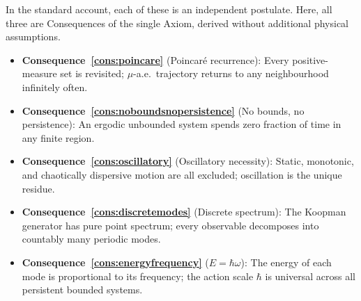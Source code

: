 In the standard account, each of these is an independent postulate.
Here, all three are Consequences of the single Axiom, derived without
additional physical assumptions.

\bigskip
\begin{tcolorbox}[colback=crownblue!5, colframe=crownblue!60!black,
                  title={\textbf{Chapter 3 Summary}}]
\begin{itemize}[noitemsep]
  \item \textbf{Consequence~\ref{cons:poincare}} (Poincaré recurrence):
    Every positive-measure set is revisited; $\mu$-a.e.\ trajectory
    returns to any neighbourhood infinitely often.
  \item \textbf{Consequence~\ref{cons:noboundsnopersistence}} (No bounds,
    no persistence): An ergodic unbounded system spends zero fraction of
    time in any finite region.
  \item \textbf{Consequence~\ref{cons:oscillatory}} (Oscillatory
    necessity): Static, monotonic, and chaotically dispersive motion are
    all excluded; oscillation is the unique residue.
  \item \textbf{Consequence~\ref{cons:discretemodes}} (Discrete spectrum):
    The Koopman generator has pure point spectrum; every observable
    decomposes into countably many periodic modes.
  \item \textbf{Consequence~\ref{cons:energyfrequency}}
    ($E=\hbar\omega$): The energy of each mode is proportional to its
    frequency; the action scale $\hbar$ is universal across all persistent
    bounded systems.
\end{itemize}
\end{tcolorbox}
